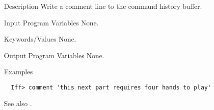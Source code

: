 
\begin{IFFcom}
\item[Description] Write a comment line to the command history buffer. 
\item[Input Program Variables] None.
\item[Keywords/Values]  None.
\item[Output Program Variables]  None.
\item[Examples] {\hspace{1.in} \vspace{-0.1truein} \relax }
\begin{verbatim} 
  Iff> comment 'this next part requires four hands to play'
\end{verbatim} \noindent %
\item[See also] {}. 
\end{IFFcom}


